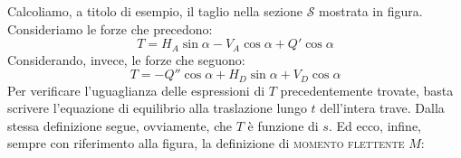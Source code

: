 \noindent Calcoliamo, a titolo di esempio, il taglio nella sezione $\mathcal{S}$ mostrata in figura. Consideriamo le forze che precedono:
\begin{equation} \label{equazione11-4}
\boxed{ T = H_{A}\sin{\alpha} - V_{A}\cos{\alpha} + Q'\cos{\alpha} } \tag{11.4}
\end{equation}
Considerando, invece, le forze che seguono:
\begin{equation} \label{equazione11-5}
\boxed{ T = -Q''\cos{\alpha} + H_{D}\sin{\alpha} + V_{D}\cos{\alpha} } \tag{11.5}
\end{equation}
Per verificare l'uguaglianza delle espressioni di $T$ precedentemente trovate, basta scrivere l'equazione di equilibrio alla traslazione lungo $t$ dell'intera trave. Dalla stessa definizione segue, ovviamente, che $T$ è funzione di $s$. Ed ecco, infine, sempre con riferimento alla figura, la definizione di \textsc{momento flettente} $M$:
\\

\\

